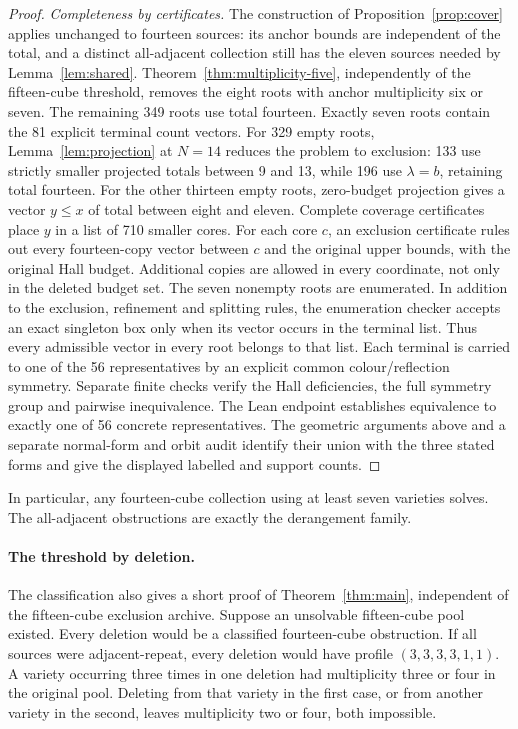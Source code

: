 \begin{proof}
\emph{Completeness by certificates.} The construction of
Proposition~\ref{prop:cover} applies unchanged to fourteen sources: its
anchor bounds are independent of the total, and a distinct all-adjacent
collection still has the eleven sources needed by Lemma~\ref{lem:shared}.
Theorem~\ref{thm:multiplicity-five}, independently of
the fifteen-cube threshold, removes the eight roots with anchor
multiplicity six or seven. The remaining 349 roots use total fourteen.
Exactly seven roots contain the 81 explicit terminal count vectors.
For 329 empty roots, Lemma~\ref{lem:projection} at $N=14$ reduces the
problem to exclusion: 133 use strictly smaller projected totals between
9 and 13, while 196 use $\lambda=b$, retaining total fourteen.
For the other thirteen empty roots, zero-budget projection gives a vector
$y\le x$ of total between eight and eleven. Complete coverage certificates
place $y$ in a list of 710 smaller cores. For each core $c$, an exclusion
certificate rules out every fourteen-copy vector between $c$ and the
original upper bounds, with the original Hall budget. Additional copies
are allowed in every coordinate, not only in the deleted budget set.
The seven nonempty roots are enumerated. In addition to the exclusion, refinement and splitting rules,
the enumeration checker
accepts an exact singleton box only when its vector occurs in the terminal
list. Thus every admissible vector in every root belongs to that list.
Each terminal is carried to one of the 56 representatives by an explicit
common colour/reflection symmetry. Separate finite checks verify the
Hall deficiencies, the full symmetry group and pairwise inequivalence.
The Lean endpoint establishes equivalence to exactly one of 56 concrete
representatives. The geometric arguments above and a separate normal-form
and orbit audit identify their union with the three stated forms and give
the displayed labelled and support counts.
\end{proof}

In particular, any fourteen-cube collection using at least seven varieties solves. The all-adjacent obstructions
are exactly the derangement family.

\paragraph{The threshold by deletion.}
The classification also gives a short proof of Theorem~\ref{thm:main},
independent of the fifteen-cube exclusion archive. Suppose an unsolvable fifteen-cube pool existed. Every deletion
would be a classified fourteen-cube obstruction. If all sources were
adjacent-repeat, every deletion would have profile $(3,3,3,3,1,1)$.
A variety occurring three times in one deletion had multiplicity three or four in the
original pool. Deleting from that variety in the first case, or from
another variety in the second, leaves multiplicity two or four, both
impossible.

